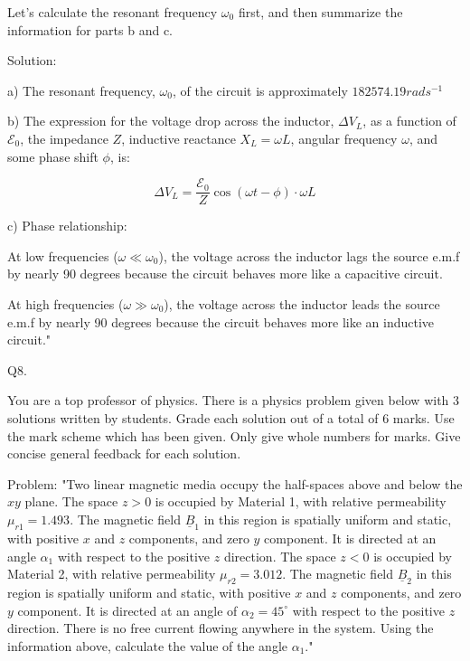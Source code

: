 Let's calculate the resonant frequency \( \omega_{0} \) first, and then summarize the information for parts b and c.

Solution:

a) The resonant frequency, \( \omega_0 \), of the circuit is approximately \( 182574.19 rads^{-1} \)

b) The expression for the voltage drop across the inductor, \( \Delta V_L \), as a function of \( \mathcal{E}_0 \), the impedance \(Z\), inductive reactance \(X_L = \omega L\), angular frequency \( \omega \), and some phase shift \( \phi \), is:

\[ \Delta V_L = \frac{\mathcal{E}_0}{Z} \cos(\omega t - \phi) \cdot \omega L \]

c) Phase relationship:

At low frequencies (\( \omega \ll \omega_0 \)), the voltage across the inductor lags the source e.m.f by nearly 90 degrees because the circuit behaves more like a capacitive circuit.

At high frequencies (\( \omega \gg \omega_0 \)), the voltage across the inductor leads the source e.m.f by nearly 90 degrees because the circuit behaves more like an inductive circuit."



                           Q8. 

You are a top professor of physics. There is a physics problem given below with 3 solutions written by students. Grade each solution out of a total of 6 marks. Use the mark scheme which has been given. Only give whole numbers for marks. Give concise general feedback for each solution. 

Problem:
"Two linear magnetic media occupy the half-spaces above and below the \( xy \) plane. The space \( z > 0 \) is occupied by Material 1, with relative permeability \( \mu_{r1} = 1.493 \). The magnetic field \( \underline{B}_{1} \) in this region is spatially uniform and static, with positive \( x \) and \( z \) components, and zero \( y \) component. It is directed at an angle \( \alpha_{1} \) with respect to the positive \( z \) direction. The space \( z < 0 \) is occupied by Material 2, with relative permeability \( \mu_{r2}= 3.012 \). The magnetic field \( \underline{B}_{2} \) in this region is spatially uniform and static, with positive \( x \) and \( z \) components, and zero \( y \) component. It is directed at an angle of \( \alpha_{2} = 45^\circ \) with respect to the positive \( z \) direction. There is no free current flowing anywhere in the system. Using the information above, calculate the value of the angle \( \alpha_{1} \)."

